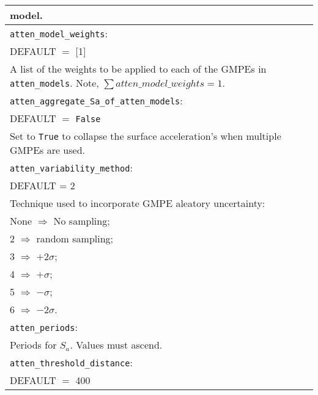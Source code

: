 \documentclass[a4paper, 12pt]{report}
\begin{document}
\begin{tabular}{|p{\textwidth}|}
  \hspace{14.5em}  model. \\
\hline \vspace{0.1em} \texttt{atten\_model\_weights}: \\
DEFAULT $=$ [1] \\
A list of the weights to be applied to each of the GMPEs in
\texttt{atten\_models}.  Note, $\sum  atten\_model\_weights=1$. \\
\hline \vspace{0.1em}
\texttt{atten\_aggregate\_Sa\_of\_atten\_models}: \\
DEFAULT $=$ \texttt{False} \\
Set to \texttt{True} to collapse the surface acceleration's when
multiple GMPEs are used.\\
\hline \vspace{0.1em} \texttt{atten\_variability\_method}: \\
DEFAULT  = 2 \\
 Technique used to
incorporate GMPE aleatory uncertainty: \\
 \hspace{0.5em} None $\Rightarrow$ No sampling; \\
 \hspace{0.5em} 2 $\Rightarrow$ random sampling; \\
 \hspace{0.5em} 3 $\Rightarrow$ $+2\sigma$; \\
 \hspace{0.5em} 4 $\Rightarrow$ $+\sigma$; \\
 \hspace{0.5em} 5 $\Rightarrow$ $-\sigma$; \\
 \hspace{0.5em} 6 $\Rightarrow$ $-2\sigma$.\\
\hline \vspace{0.1em} \texttt{atten\_periods}: \\
Periods for $S_a$. Values must ascend. \\
\hline \vspace{0.1em} \texttt{atten\_threshold\_distance}: \\
DEFAULT $=$ 400 \\

\end{tabular}
\end{document}
